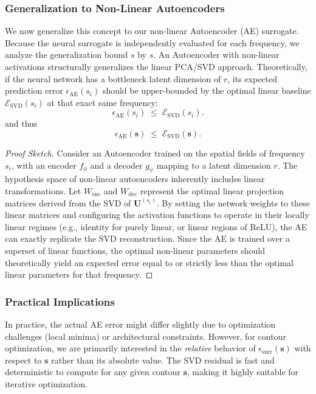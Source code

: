 \documentclass[11pt, a4paper]{article}
\begin{document}
\subsubsection{Generalization to Non-Linear Autoencoders}

We now generalize this concept to our non-linear Autoencoder (AE) surrogate. Because the neural surrogate is independently evaluated for each frequency, we analyze the generalization bound $s$ by $s$. An Autoencoder with non-linear activations structurally generalizes the linear PCA/SVD approach. Theoretically, if the neural network has a bottleneck latent dimension of $r$, its expected prediction error $\epsilon_{\mathrm{AE}}(s_i)$ should be upper-bounded by the optimal linear baseline $\mathcal{E}_{\mathrm{SVD}}(s_i)$ at that exact same frequency:
\begin{equation}
    \epsilon_{\mathrm{AE}}(s_i) \;\leq\; \mathcal{E}_{\mathrm{SVD}}(s_i).
\end{equation}
and thus
\begin{equation}
    \epsilon_{\mathrm{AE}}(\mathbf{s}) \;\leq\; \mathcal{E}_{\mathrm{SVD}}(\mathbf{s}).
\end{equation}

\begin{proof}[Proof Sketch]
Consider an Autoencoder trained on the spatial fields of frequency $s_i$, with an encoder $f_{\phi}$ and a decoder $g_{\psi}$ mapping to a latent dimension $r$. The hypothesis space of non-linear autoencoders inherently includes linear transformations. Let $W_{\mathrm{enc}}$ and $W_{\mathrm{dec}}$ represent the optimal linear projection matrices derived from the SVD of $\mathbf{U}^{(s_i)}$. By setting the network weights to these linear matrices and configuring the activation functions to operate in their locally linear regimes (e.g., identity for purely linear, or linear regions of ReLU), the AE can exactly replicate the SVD reconstruction. Since the AE is trained over a superset of linear functions, the optimal non-linear parameters should theoretically yield an expected error equal to or strictly less than the optimal linear parameters for that frequency.
\end{proof}



\subsubsection{Practical Implications}

In practice, the actual AE error might differ slightly due to optimization challenges (local minima) or architectural constraints. However, for contour optimization, we are primarily interested in the \emph{relative} behavior of $\epsilon_{\mathrm{surr}}(\mathbf{s})$ with respect to $\mathbf{s}$ rather than its absolute value. The SVD residual is fast and deterministic to compute for any given contour $\mathbf{s}$, making it highly suitable for iterative optimization.
\end{document}

